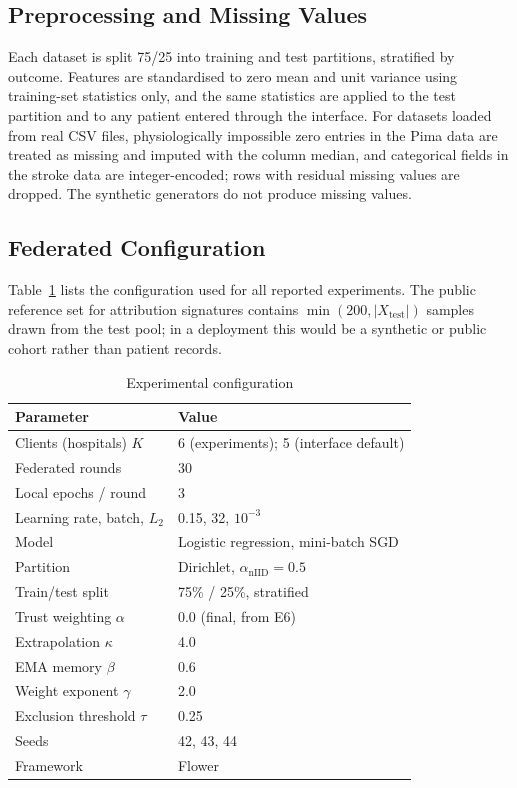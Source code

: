 \documentclass[conference]{IEEEtran}
\begin{document}
\subsection{Preprocessing and Missing Values}
Each dataset is split 75/25 into training and test partitions, stratified by
outcome. Features are standardised to zero mean and unit variance using
training-set statistics only, and the same statistics are applied to the test
partition and to any patient entered through the interface. For datasets
loaded from real CSV files, physiologically impossible zero entries in the
Pima data are treated as missing and imputed with the column median, and
categorical fields in the stroke data are integer-encoded; rows with residual
missing values are dropped. The synthetic generators do not produce missing
values.

\subsection{Federated Configuration}
Table~\ref{tab:config} lists the configuration used for all reported
experiments. The public reference set for attribution signatures contains
$\min(200, |X_{\mathrm{test}}|)$ samples drawn from the test pool; in a
deployment this would be a synthetic or public cohort rather than patient
records.

\begin{table}[t]
 \caption{Experimental configuration}
 \label{tab:config}
 \centering
 \small
 \begin{tabular}{ll}
 \toprule
 Parameter & Value \\
 \midrule
 Clients (hospitals) $K$ & 6 (experiments); 5 (interface default) \\
 Federated rounds & 30 \\
 Local epochs / round & 3 \\
 Learning rate, batch, $L_2$ & 0.15, 32, $10^{-3}$ \\
 Model & Logistic regression, mini-batch SGD \\
 Partition & Dirichlet, $\alpha_{\mathrm{nIID}}=0.5$ \\
 Train/test split & 75\% / 25\%, stratified \\
 Trust weighting $\alpha$ & 0.0 (final, from E6) \\
 Extrapolation $\kappa$ & 4.0 \\
 EMA memory $\beta$ & 0.6 \\
 Weight exponent $\gamma$ & 2.0 \\
 Exclusion threshold $\tau$ & 0.25 \\
 Seeds & 42, 43, 44 \\
 Framework & Flower \\
 \bottomrule
 \end{tabular}
\end{table}
\end{document}

